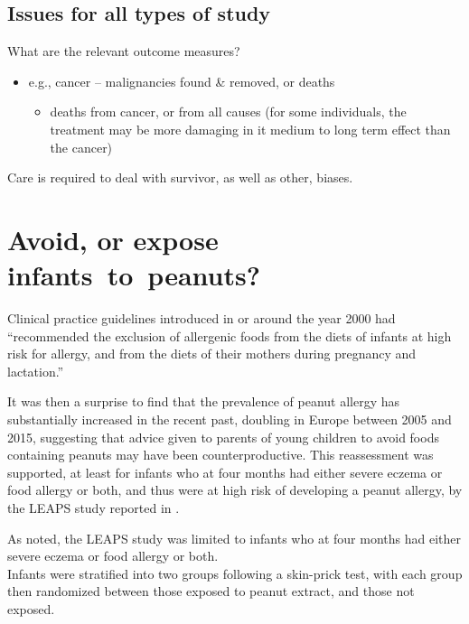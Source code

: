 \documentclass[
  10pt,
  b5paper]{book}
\providecommand{\tightlist}{%
  \setlength{\itemsep}{0pt}\setlength{\parskip}{0pt}}
\begin{document}
\hypertarget{issues-for-all-types-of-study}{%
\subsection*{Issues for all types of study}\label{issues-for-all-types-of-study}}

What are the relevant outcome measures?

\begin{itemize}
\tightlist
\item
  e.g., cancer -- malignancies found \& removed, or deaths

  \begin{itemize}
  \tightlist
  \item
    deaths from cancer, or from all causes (for some individuals,
    the treatment may be more damaging in it medium to long term effect
    than the cancer)
  \end{itemize}
\end{itemize}

Care is required to deal with survivor, as well as other, biases.

\hypertarget{avoid-or-expose-infants-to-peanuts}{%
\section{Avoid, or expose infants~to~peanuts?}\label{avoid-or-expose-infants-to-peanuts}}

Clinical practice guidelines introduced in or around the
year 2000 had ``recommended the exclusion of
allergenic foods from the diets of infants at high risk for
allergy, and from the diets of their mothers during pregnancy
and lactation.''

It was then a surprise to find that
the prevalence of peanut allergy has substantially increased
in the recent past, doubling in Europe between 2005 and 2015,
suggesting that advice given to parents of young children to
avoid foods containing peanuts may have been counterproductive.
This reassessment was supported, at least for infants who
at four months had either severe eczema or food allergy or
both, and thus were at high risk of developing a peanut
allergy, by the LEAPS study reported in \citet{du2015randomized}.

As noted, the LEAPS study was limited to infants who at four
months had either severe eczema or food allergy or both.\\
Infants were stratified into two groups following a skin-prick
test, with each group then randomized between those exposed
to peanut extract, and those not exposed.
\end{document}
